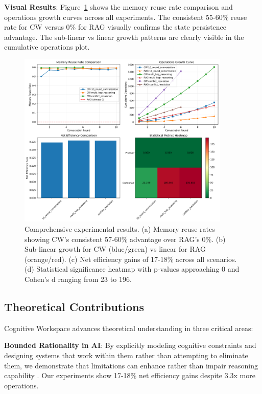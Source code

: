 \documentclass[10pt,twocolumn]{article}
\begin{document}
\textbf{Visual Results}:
Figure~\ref{fig:results} shows the memory reuse rate comparison and operations growth curves across all experiments. The consistent 55-60\% reuse rate for CW versus 0\% for RAG visually confirms the state persistence advantage. The sub-linear vs linear growth patterns are clearly visible in the cumulative operations plot.

\begin{figure}[t]
\centering
\includegraphics[width=0.9\textwidth]{cognitive_workspace_analysis.png}
\caption{Comprehensive experimental results. (a) Memory reuse rates showing CW's consistent 57-60\% advantage over RAG's 0\%. (b) Sub-linear growth for CW (blue/green) vs linear for RAG (orange/red). (c) Net efficiency gains of 17-18\% across all scenarios. (d) Statistical significance heatmap with p-values approaching 0 and Cohen's d ranging from 23 to 196.}
\label{fig:results}
\end{figure}

\subsection{Theoretical Contributions}

Cognitive Workspace advances theoretical understanding in three critical areas:

\textbf{Bounded Rationality in AI}: By explicitly modeling cognitive constraints and designing systems that work within them rather than attempting to eliminate them, we demonstrate that limitations can enhance rather than impair reasoning capability \cite{simon1955behavioral}. Our experiments show 17-18\% net efficiency gains despite 3.3x more operations.
\end{document}
